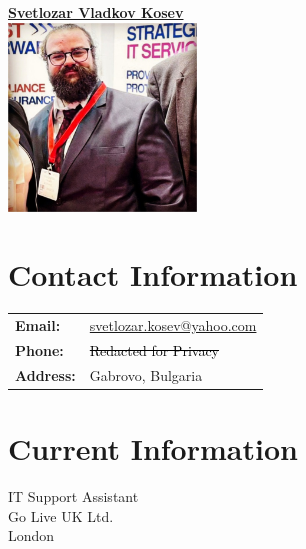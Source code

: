 \documentclass[letterpaper,10pt]{article}
\begin{document}
	
	\pagestyle{empty} %
		
\begin{center}
	\begin{minipage}[t]{0.5\textwidth}
		\centering
		\Large\textbf{\href{https://www.linkedin.com/in/svetlozar-kosev-m-sc-it-278058144/}{Svetlozar Vladkov Kosev}}\\[2ex]
		\includegraphics[width=5cm,height=5cm]{your_photo.jpg}
	\end{minipage}%
	\begin{minipage}[t]{0.5\textwidth}
		\section*{Contact Information}
		\begin{tabular}{@{}l l}
			\textbf{Email:} & \href{mailto:svetlozar.kosev@}{svetlozar.kosev@yahoo.com} \\
			\textbf{Phone:} & \textcolor{black}{\st{Redacted for Privacy}} \\
			\textbf{Address:} & Gabrovo, Bulgaria \\
		\end{tabular}
		
		\section*{Current Information}
		IT Support Assistant \\
		Go Live UK Ltd. \\
		London \\
	\end{minipage}
\end{center}
		
\end{document}
